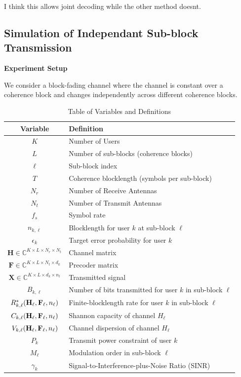 \documentclass[a4paper, 12pt, onecolumn, journal, twoside, draftclsnofoot]{IEEEtran}
\begin{document}
I think this allows joint decoding while the other method doesnt.

\newpage
\subsection{Simulation of Independant Sub-block Transmission}
\textbf{Experiment Setup}

We consider a block-fading channel where the channel is constant over a coherence block and changes independently across different coherence blocks.

\begin{table}[H]
\centering
\caption{Table of Variables and Definitions}
\begin{tabular}{|c|l|}
\hline
\textbf{Variable} & \textbf{Definition} \\ \hline
$K$ & Number of Users \\ \hline
$L$ & Number of sub-blocks (coherence blocks) \\ \hline
$\ell$ & Sub-block index \\ \hline
$T$ & Coherence blocklength (symbols per sub-block) \\ \hline
$N_r$ & Number of Receive Antennas \\ \hline
$N_t$ & Number of Transmit Antennas \\ \hline
$f_s$ & Symbol rate \\ \hline
$n_{k,\ell}$ & Blocklength for user $k$ at sub-block $\ell$ \\ \hline
$\epsilon_k$ & Target error probability for user $k$ \\ \hline

$\mathbf{H} \in \mathbb{C}^{K \times L \times N_r \times N_t}$ & Channel matrix \\ \hline
$\mathbf{F} \in \mathbb{C}^{K \times L \times N_t \times d_k}$ & Precoder matrix \\ \hline
$\mathbf{X} \in \mathbb{C}^{K \times L \times d_k \times n_l}$ & Transmitted signal \\ \hline

$B_{k, \ell}$ & Number of bits transmitted for user $k$ in sub-block $\ell$ \\ \hline
$R^*_{k,\ell}({\bf H}_\ell, {\bf F}_\ell, n_\ell)$ & Finite-blocklength rate for user $k$ in sub-block $\ell$ \\ \hline
$C_{k,\ell}({\bf H}_\ell, {\bf F}_\ell, n_\ell)$ & Shannon capacity of channel $H_\ell$ \\ \hline
$V_{k,\ell}({\bf H}_\ell, {\bf F}_\ell, n_\ell)$ & Channel dispersion of channel $H_\ell$ \\ \hline

$P_{k}$ & Transmit power constraint of user $k$\\ \hline
$M_\ell$ & Modulation order in sub-block $\ell$ \\ \hline
$\gamma_k$ & Signal-to-Interference-plus-Noise Ratio (SINR) \\ \hline
\end{tabular}
\label{tab:variables_sim}
\end{table}
\end{document}
